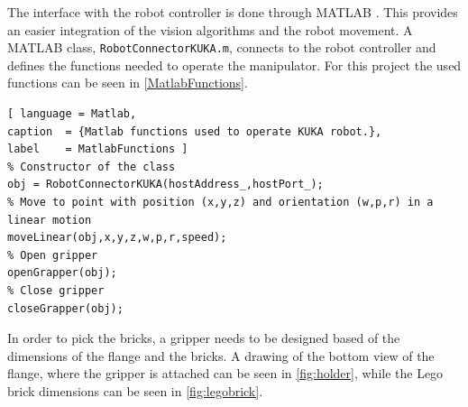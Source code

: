 The interface with the robot controller is done through MATLAB \cite{matlab}. This provides an easier integration of the vision algorithms and the robot movement. A MATLAB class, \lstinline[style=matlabinline]{RobotConnectorKUKA.m}, connects to the robot controller and defines the functions needed to operate the manipulator. For this project the used functions can be seen in \autoref{MatlabFunctions}.

\begin{lstlisting}[ language = Matlab,
caption  = {Matlab functions used to operate KUKA robot.},
label    = MatlabFunctions ]
% Constructor of the class
obj = RobotConnectorKUKA(hostAddress_,hostPort_);
% Move to point with position (x,y,z) and orientation (w,p,r) in a linear motion
moveLinear(obj,x,y,z,w,p,r,speed);
% Open gripper
openGrapper(obj);
% Close gripper
closeGrapper(obj);
\end{lstlisting}

In order to pick the bricks, a gripper needs to be designed based of the dimensions of the flange and the bricks. A drawing of the bottom view of the flange, where the gripper is attached can be seen in \autoref{fig:holder}, while the Lego brick dimensions can be seen in \autoref{fig:legobrick}.

